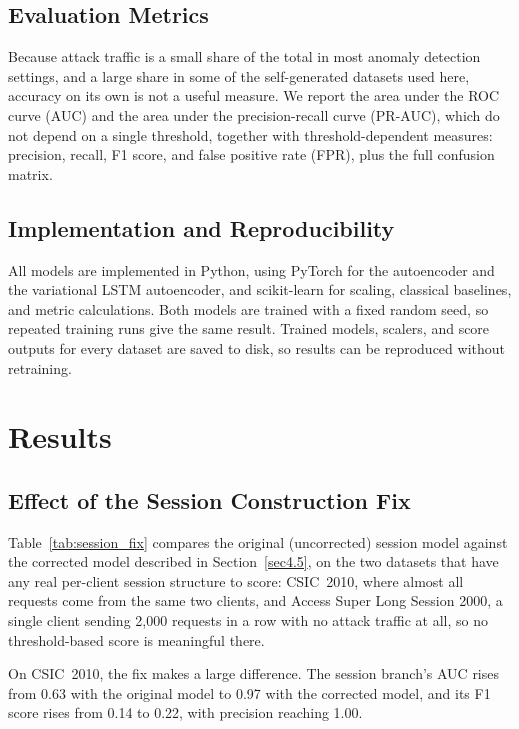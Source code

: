 \documentclass[futureinternet,article,accept,moreauthors]{Definitions/mdpi}
\begin{document}
\subsection{Evaluation Metrics}

Because attack traffic is a small share of the total in most anomaly detection settings, and a large share in some of the self-generated datasets used here, accuracy on its own is not a useful measure. We report the area under the ROC curve (AUC) and the area under the precision-recall curve (PR-AUC), which do not depend on a single threshold, together with threshold-dependent measures: precision, recall, F1 score, and false positive rate (FPR), plus the full confusion matrix.

\subsection{Implementation and Reproducibility}

All models are implemented in Python, using PyTorch for the autoencoder and the variational LSTM autoencoder, and scikit-learn for scaling, classical baselines, and metric calculations. Both models are trained with a fixed random seed, so repeated training runs give the same result. Trained models, scalers, and score outputs for every dataset are saved to disk, so results can be reproduced without retraining.

\section{Results} \label{sec5}

\subsection{Effect of the Session Construction Fix}

Table~\ref{tab:session_fix} compares the original (uncorrected) session model against the corrected model described in Section~\ref{sec4.5}, on the two datasets that have any real per-client session structure to score: CSIC~2010, where almost all requests come from the same two clients, and Access Super Long Session 2000, a single client sending 2{,}000 requests in a row with no attack traffic at all, so no threshold-based score is meaningful there.

On CSIC~2010, the fix makes a large difference. The session branch's AUC rises from 0.63 with the original model to 0.97 with the corrected model, and its F1 score rises from 0.14 to 0.22, with precision reaching 1.00.
\end{document}
